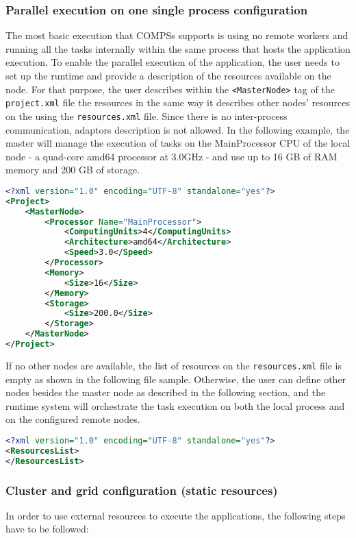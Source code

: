 \subsubsection{Parallel execution on one single process configuration}
The most basic execution that COMPSs supports is using no remote workers and running all the tasks internally within the same process that hosts the application execution. To enable the parallel execution of the application, the user needs to set up the runtime and provide a description of the resources available on the node. For that purpose, the user describes within the \texttt{<MasterNode>} tag of the \texttt{project.xml} file the resources in the same way it describes other nodes' resources on the using the \texttt{resources.xml} file. Since there is no inter-process communication, adaptors description is not allowed. In the following example, the master will manage the execution of tasks on the MainProcessor CPU of the local node - a quad-core amd64 processor at 3.0GHz - and use up to 16 GB of RAM memory and 200 GB of storage.

\begin{lstlisting}[language=xml]
<?xml version="1.0" encoding="UTF-8" standalone="yes"?>
<Project>
    <MasterNode>
        <Processor Name="MainProcessor">
            <ComputingUnits>4</ComputingUnits>
            <Architecture>amd64</Architecture>
            <Speed>3.0</Speed>
        </Processor>
        <Memory>
            <Size>16</Size>
        </Memory>
        <Storage>
            <Size>200.0</Size>
        </Storage>
    </MasterNode>
</Project>
\end{lstlisting}

If no other nodes are available, the list of resources on the \texttt{resources.xml} file is empty as shown in the following file sample. Otherwise, the user can define other nodes besides the master node as described in the following section, and the runtime system will orchestrate the task execution on both the local process and on the configured remote nodes.
~ \newline 
\begin{lstlisting}[language=xml]
<?xml version="1.0" encoding="UTF-8" standalone="yes"?>
<ResourcesList>
</ResourcesList>
\end{lstlisting}

\subsubsection{Cluster and grid configuration (static resources)}
In order to use external resources to execute the applications, the following steps have to be followed:

